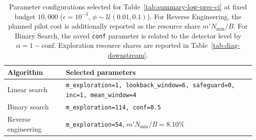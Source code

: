\begin{table}[ht]
\centering
\footnotesize
\caption{Parameter configurations selected for Table~\ref{tab:summary-low-prec-ci} at fixed budget $10{,}000$ ($\epsilon=10^{-3}$, $\phi\sim\mathcal{U}(0.01,0.1)$). For Reverse Engineering, the planned pilot cost is additionally reported as the resource share $m'N_{\min}/B$. For Binary Search, the saved \texttt{conf} parameter is related to the detector level by $\alpha=1-\mathrm{conf}$. Exploration resource shares are reported in Table~\ref{tab:diag-downstream}.}
\label{tab:opt-param-first-tab}
\begin{tabular}{ll}
\toprule
Algorithm
& Selected parameters \\
\midrule
Linear search
& \texttt{m\_exploration=1, lookback\_window=6, safeguard=0, inc=1, mean\_window=4} \\
Binary search
& \texttt{m\_exploration=114, conf=0.5} \\
Reverse engineering
& \texttt{m\_exploration=54}, $m'N_{\min}/B=8.10\%$ \\
\bottomrule
\end{tabular}
\end{table}
